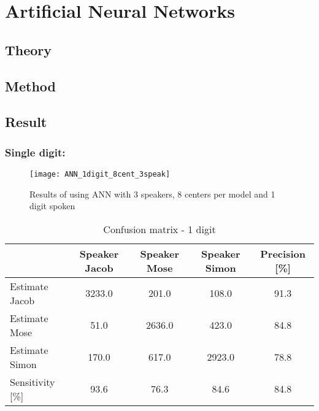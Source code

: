 \chapter{Artificial Neural Networks}

\section{Theory}

\section{Method}

\section{Result}





\subsection{Single digit:}
\begin{figure}[H]
\centering
\texttt{[image: ANN\_1digit\_8cent\_3speak]}
\caption{Results of using ANN with 3 speakers, 8 centers per model and 1 digit spoken}
\label{fig:ANN_fig_1}
\end{figure}

\begin{table}[H]                                                    
\centering                                                          
\begin{tabular}{|l|c|c|c|c|}                                        
\hline                                                              
  & Speaker Jacob & Speaker Mose & Speaker Simon & Precision [\%] \\
\hline                                                              
Estimate Jacob & 3233.0 & 201.0 & 108.0 & 91.3 \\                   
\hline                                                              
Estimate Mose & 51.0 & 2636.0 & 423.0 & 84.8 \\                     
\hline                                                              
Estimate Simon & 170.0 & 617.0 & 2923.0 & 78.8 \\                   
\hline                                                              
Sensitivity [\%] & 93.6 & 76.3 & 84.6 & 84.8 \\                     
\hline                                                              
\end{tabular}                                                       
\caption{Confusion matrix - 1 digit}                                
\label{table:ANN_conf_1}                                            
\end{table}  




